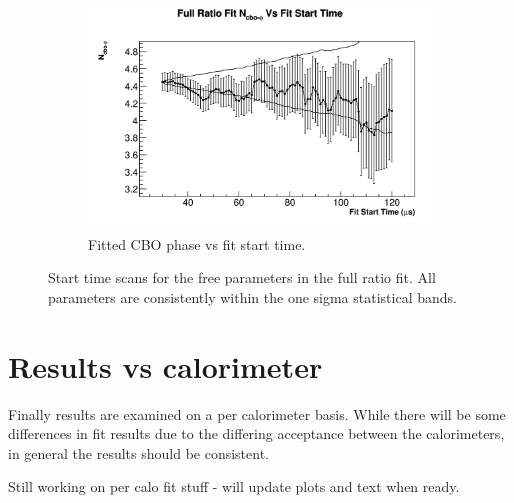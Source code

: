 \begin{figure}[]
\begin{subfigure}[t]{0.45\textwidth}
			\includegraphics[width=\textwidth]{RatioCBO_N_cbo-phi_FS_Canv}
		    \caption{Fitted CBO phase vs fit start time.}
	    \end{subfigure}%
	\caption[FitStartScans]{Start time scans for the free parameters in the full ratio fit. All parameters are consistently within the one sigma statistical bands.}
	\label{fig:FitStartScans}
	\end{figure}





\section{Results vs calorimeter}

	Finally results are examined on a per calorimeter basis. While there will be some differences in fit results due to the differing acceptance between the calorimeters, in general the results should be consistent.

	Still working on per calo fit stuff - will update plots and text when ready.

